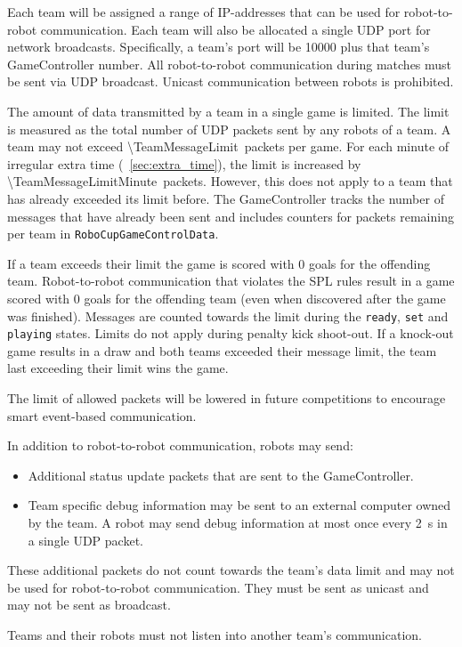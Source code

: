Each team will be assigned a range of IP-addresses that can be used for robot-to-robot communication. Each team will also be allocated a single UDP port for network broadcasts. Specifically, a team's port will be 10000 plus that team's GameController number. All robot-to-robot communication during matches must be sent via UDP broadcast. Unicast communication between robots is prohibited.

The amount of data transmitted by a team in a single game is limited. The limit is measured as the total number of UDP packets sent by any robots of a team. A team may not exceed \qty{\TeamMessageLimit}{packets} per game. For each minute of irregular extra time (\cf~\cref{sec:extra_time}), the limit is increased by \qty{\TeamMessageLimitMinute}{packets}. However, this does not apply to a team that has already exceeded its limit before. The GameController tracks the number of messages that have already been sent and includes counters for packets remaining per team in \texttt{RoboCupGameControlData}.

If a team exceeds their limit the game is scored with 0 goals for the offending team. Robot-to-robot communication that violates the SPL rules result in a game scored with 0 goals for the offending team (even when discovered after the game was finished). Messages are counted towards the limit during the \texttt{ready}, \texttt{set} and \texttt{playing} states. Limits do not apply during penalty kick shoot-out. If a knock-out game results in a draw and both teams exceeded their message limit, the team last exceeding their limit wins the game.

The limit of allowed packets will be lowered in future competitions to encourage smart event-based communication.

In addition to robot-to-robot communication, robots may send:
\begin{itemize}
 \item Additional status update packets that are sent to the GameController.
 \item Team specific debug information may be sent to an external computer owned by the team. A robot may send debug information at most once every \qty{2}{\second} in a single UDP packet.
\end{itemize}
These additional packets do not count towards the team's data limit and may not be used for robot-to-robot communication. They must be sent as unicast and may not be sent as broadcast.

Teams and their robots must not listen into another team's communication.

